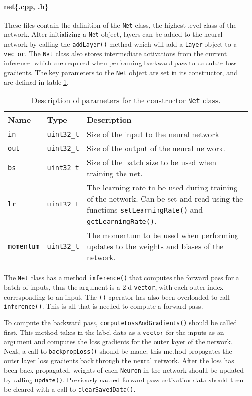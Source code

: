 \paragraph{net\{.cpp, .h\}}
These files contain the definition of the \texttt{Net} class, the highest-level class of the network. After initializing a \texttt{Net} object, layers can be added to the neural network by calling the \texttt{addLayer()} method which will add a \texttt{Layer} object to a \texttt{vector}. The \texttt{Net} class also stores intermediate activations from the current inference, which are required when performing backward pass to calculate loss gradients. The key parameters to the \texttt{Net} object are set in its constructor, and are defined in table \ref{nettable}. 
\begin{table}
	\centering
	\begin{tabularx}{\textwidth}{|l|l|X|}
		\hline
		\textbf{Name} 			& \textbf{Type} 		& \textbf{Description} \\\hline
		\texttt{in}  			& \texttt{uint32\_t}	& Size of the input to the neural network.\\\hline
		\texttt{out}			& \texttt{uint32\_t}	& Size of the output of the neural network. \\\hline 
		\texttt{bs}				& \texttt{uint32\_t}	& Size of the batch size to be used when training the net.\\\hline 
		\texttt{lr}				& \texttt{uint32\_t}	& The learning rate to be used during training of the network. Can be set and read using the functions \texttt{setLearningRate()} and \texttt{getLearningRate()}. \\\hline 
		\texttt{momentum}		& \texttt{uint32\_t}	& The momentum to be used when performing updates to the weights and biases of the network.
		\\\hline
	\end{tabularx}
	\caption{Description of parameters for the constructor \texttt{Net} class.}
	\label{nettable}
\end{table}
\par 
The \texttt{Net} class has a method \texttt{inference()} that computes the forward pass for a batch of inputs, thus the argument is a 2-d \texttt{vector}, with each outer index corresponding to an input. The \texttt{()} operator has also been overloaded to call \texttt{inference()}. This is all that is needed to compute a forward pass.
\par 
To compute the backward pass, \texttt{computeLossAndGradients()} should be called first. This method takes in the label data as a \texttt{vector} for the inputs as an argument and computes the loss gradients for the outer layer of the network. Next, a call to \texttt{backpropLoss()} should be made; this method propagates the outer layer loss gradients back through the neural network. After the loss has been back-propagated, weights of each \texttt{Neuron} in the network should be updated by calling \texttt{update()}. Previously cached forward pass activation data should then be cleared with a call to \texttt{clearSavedData()}.
